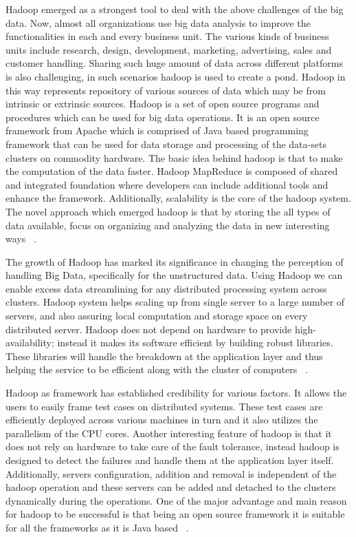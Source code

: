 Hadoop emerged as a strongest  tool to deal with the above challenges of the big
data. Now, almost all organizations use big data analysis to improve the 
functionalities in each and every business unit. The various kinds of business 
units include research, design, development, marketing, advertising, sales  and 
customer handling. Sharing such huge amount of data across different platforms  
is also challenging,  in such scenarios hadoop is used to create a pond. Hadoop 
in this way represents repository of various sources of data which may be from 
intrinsic or extrinsic sources. Hadoop is a set of open source programs and 
procedures which can be used for big data operations. It is an open source 
framework from Apache which is comprised of Java based programming framework 
that can be used for data storage and processing of the data-sets clusters on 
commodity hardware. The basic idea behind hadoop is that to make the computation
of the data faster. Hadoop MapReduce is composed of shared and integrated 
foundation where developers can include additional tools and enhance the 
framework. Additionally, scalability is the core of the hadoop system. The novel
approach which emerged hadoop is that by storing the all types of data 
available, focus on organizing and analyzing the data in new interesting ways
~\cite{hid-sp18-406-hadoop-intro2}.

The growth of Hadoop has marked its significance in changing the perception of 
handling Big Data, specifically for the unstructured data. Using Hadoop we can 
enable excess data streamlining for any distributed processing system across 
clusters. Hadoop system helps scaling up from single server to a large number 
of servers, and also assuring local computation and storage space on every 
distributed server. Hadoop does not depend on hardware to provide 
high-availability; instead it makes its software efficient by building robust 
libraries. These libraries will handle the breakdown at the application layer 
and thus helping the service to be efficient along with the cluster of computers
~\cite{hid-sp18-406-hadoop-intro3}.

Hadoop as framework has established credibility for various factors. It allows 
the users to easily frame test cases on distributed systems. These test cases 
are efficiently deployed across various machines in turn and it also utilizes 
the parallelism of the CPU cores. Another interesting feature of hadoop is that 
it does not rely on hardware to take care of the fault tolerance, instead hadoop
is designed to detect the failures and handle them at the application layer 
itself. Additionally, servers configuration, addition and removal is independent
of the hadoop operation and these servers can be added and detached to the 
clusters dynamically during the operations. One of the major advantage and main 
reason for hadoop to be successful is that being an open source framework it is 
suitable for all the frameworks as it is Java based
~\cite{hid-sp18-406-hadoop-intro4}.

